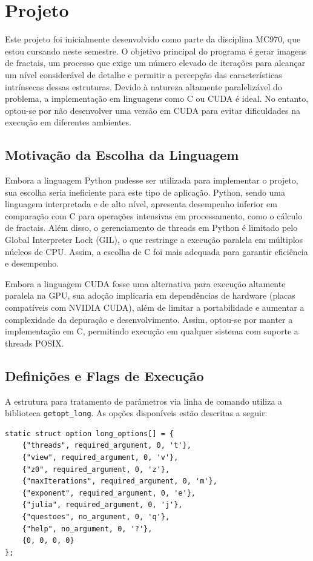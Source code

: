 \section{Projeto}

Este projeto foi inicialmente desenvolvido como parte da disciplina MC970, que estou cursando neste semestre. O objetivo principal do programa é gerar imagens de fractais, um processo que exige um número elevado de iterações para alcançar um nível considerável de detalhe e permitir a percepção das características intrínsecas dessas estruturas. Devido à natureza altamente paralelizável do problema, a implementação em linguagens como C ou CUDA é ideal. No entanto, optou-se por não desenvolver uma versão em CUDA para evitar dificuldades na execução em diferentes ambientes.

\subsection{Motivação da Escolha da Linguagem}

Embora a linguagem Python pudesse ser utilizada para implementar o projeto, sua escolha seria ineficiente para este tipo de aplicação. Python, sendo uma linguagem interpretada e de alto nível, apresenta desempenho inferior em comparação com C para operações intensivas em processamento, como o cálculo de fractais. Além disso, o gerenciamento de threads em Python é limitado pelo Global Interpreter Lock (GIL), o que restringe a execução paralela em múltiplos núcleos de CPU. Assim, a escolha de C foi mais adequada para garantir eficiência e desempenho.

Embora a linguagem CUDA fosse uma alternativa para execução altamente paralela na GPU, sua adoção implicaria em dependências de hardware (placas compatíveis com NVIDIA CUDA), além de limitar a portabilidade e aumentar a complexidade da depuração e desenvolvimento. Assim, optou-se por manter a implementação em C, permitindo execução em qualquer sistema com suporte a threads POSIX.

\subsection{Definições e Flags de Execução}

A estrutura para tratamento de parâmetros via linha de comando utiliza a biblioteca \texttt{getopt\_long}. As opções disponíveis estão descritas a seguir:


\begin{lstlisting}[caption=Flags de linha de comando]
static struct option long_options[] = {
    {"threads", required_argument, 0, 't'},
    {"view", required_argument, 0, 'v'},
    {"z0", required_argument, 0, 'z'},
    {"maxIterations", required_argument, 0, 'm'},
    {"exponent", required_argument, 0, 'e'},
    {"julia", required_argument, 0, 'j'},
    {"questoes", no_argument, 0, 'q'},
    {"help", no_argument, 0, '?'},
    {0, 0, 0, 0}
};
\end{lstlisting}

